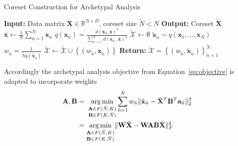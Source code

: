 \documentclass[oneside]{article}
\DeclareMathOperator*{\argmin}{arg\,min}
\begin{document}
\begin{algorithm}[H]
    \caption{Coreset Construction for Archetypal Analysis}
    \label{alg:coreset_aa}
    \begin{algorithmic}[1]
    \State \textbf{Input:} Data matrix $\mathbf{X} \in \mathbb{R}^{N \times D}$, coreset size $\tilde{N} < N$
    \State \textbf{Output:} Coreset $\tilde{\mathbf{X}}$
    \State $\bar{\mathbf{x}} \gets \frac{1}{N} \sum_{n=1}^N \mathbf{x}_n$ 
        \State $q(\mathbf{x}_n) = \frac{d(\mathbf{x}_n, \bar{\mathbf{x}})^2}{\sum_{n^\prime=1}^N d(\mathbf{x}_{n^\prime}, \bar{\mathbf{x}})^2}$ 
    \EndFor
    \State $\tilde{\mathcal{X}} \gets \emptyset$
        \State $\tilde{\mathbf{x}}_{\tilde{n}} \sim q(\mathbf{x}_1, ..., \mathbf{x}_N)$ 
        \State $w_{\tilde{n}} = \frac{1}{\tilde{N} q(\tilde{\mathbf{x}}_{\tilde{n}})}$ 
        \State $\tilde{\mathcal{X}} \gets \tilde{\mathcal{X}} \cup \left\{ \left( w_{\tilde{n}}, \mathbf{x}_{\tilde{n}} \right) \right\}$
    \EndFor
    \State \textbf{Return:} $\tilde{\mathcal{X}} = \left\{ \left( w_{\tilde{n}}, \tilde{\mathbf{x}}_{\tilde{n}} \right) \right\}_{\tilde{n}=1}^{\tilde{N}}$
    \end{algorithmic}
\end{algorithm}

Accordingly the archetypal analysis objective from Equation~\ref{eq:objective} is adapted to incorporate weights
\begin{equation}
    \begin{aligned}
    \mathbf{A}, \mathbf{B}
        &= \; \underset{\begin{subarray}{c} \mathbf{A} \in F(\tilde{N}, K) \\
        \mathbf{B} \in F(K, \tilde{N}) \end{subarray}}{\argmin} \sum_{\tilde{n}=1}^{\tilde{N}} w_{\tilde{n}} \|  \tilde{\mathbf{x}}_{\tilde{n}} - \tilde{\mathbf{X}}^T \mathbf{B}^T \mathbf{a}_{\tilde{n}} \|_2^2 \\
        &= \underset{\begin{subarray}{c} \mathbf{A} \in F(\tilde{N}, K) \\
        \mathbf{B} \in F(K, \tilde{N}) \end{subarray}}{\argmin}
        \| \mathbf{W} \tilde{\mathbf{X}} - \mathbf{W} \mathbf{A} \mathbf{B} \tilde{\mathbf{X}} \|_F^2
    \end{aligned}
\end{equation}
\end{document}
